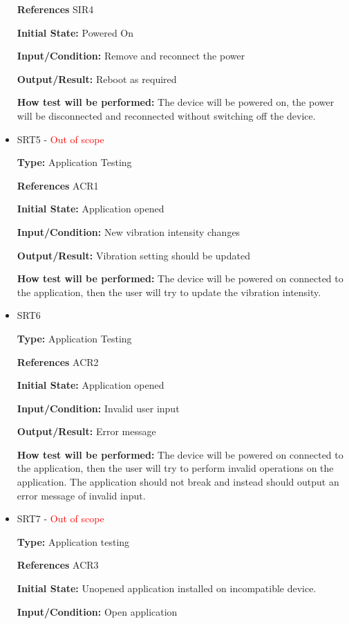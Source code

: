 \documentclass[12pt, titlepage]{article}
\begin{document}
\begin{itemize}
\textbf{References} SIR4 
					
\textbf{Initial State:} Powered On
					
\textbf{Input/Condition:} Remove and reconnect the power
					
\textbf{Output/Result:} Reboot as required
					
\textbf{How test will be performed:} The device will be powered on, the power will be disconnected and reconnected without switching off the device. 

\item{SRT5 - \textcolor{red}{Out of scope}} 

\textbf{Type:} Application Testing

\textbf{References} ACR1 
					
\textbf{Initial State:} Application opened 
					
\textbf{Input/Condition:} New vibration intensity changes
					
\textbf{Output/Result:} Vibration setting should be updated
					
\textbf{How test will be performed:} The device will be powered on connected to the application, then the user will try to update the vibration intensity. 

\item{SRT6} 

\textbf{Type:} Application Testing

\textbf{References} ACR2 
					
\textbf{Initial State:} Application opened 
					
\textbf{Input/Condition:} Invalid user input
					
\textbf{Output/Result:} Error message
					
\textbf{How test will be performed:} The device will be powered on connected to the application, then the user will try to perform invalid operations on the application. The application should not break and instead should output an error message of invalid input. 

\item{SRT7 - \textcolor{red}{Out of scope}} 

\textbf{Type:} Application testing

\textbf{References} ACR3 
					
\textbf{Initial State:} Unopened application installed on incompatible device. 
					
\textbf{Input/Condition:} Open application
					

\end{itemize}
\end{document}
